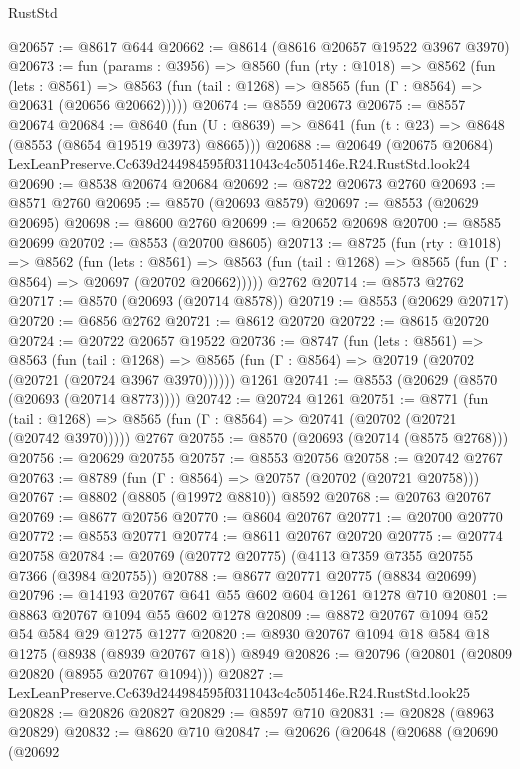 \begin{lexlean}{RustStd}
\begin{coremodule}
@20657 := @8617 @644
@20662 := @8614 (@8616 @20657 @19522 @3967 @3970)
@20673 := fun (params : @3956) =>
  @8560
    (fun (rty : @1018) =>
    @8562
      (fun (lets : @8561) =>
      @8563 (fun (tail : @1268) => @8565 (fun (Γ : @8564) => @20631 (@20656 @20662)))))
@20674 := @8559 @20673
@20675 := @8557 @20674
@20684 := @8640
    (fun (U : @8639) => @8641 (fun (t : @23) => @8648 (@8553 (@8654 @19519 @3973) @8665)))
@20688 := @20649
    (@20675 @20684)
    LexLeanPreserve.Cc639d244984595f0311043c4c505146e.R24.RustStd.look24
@20690 := @8538 @20674 @20684
@20692 := @8722 @20673 @2760
@20693 := @8571 @2760
@20695 := @8570 (@20693 @8579)
@20697 := @8553 (@20629 @20695)
@20698 := @8600 @2760
@20699 := @20652 @20698
@20700 := @8585 @20699
@20702 := @8553 (@20700 @8605)
@20713 := @8725
    (fun (rty : @1018) =>
    @8562
      (fun (lets : @8561) =>
      @8563 (fun (tail : @1268) => @8565 (fun (Γ : @8564) => @20697 (@20702 @20662)))))
    @2762
@20714 := @8573 @2762
@20717 := @8570 (@20693 (@20714 @8578))
@20719 := @8553 (@20629 @20717)
@20720 := @6856 @2762
@20721 := @8612 @20720
@20722 := @8615 @20720
@20724 := @20722 @20657 @19522
@20736 := @8747
    (fun (lets : @8561) =>
    @8563
      (fun (tail : @1268) =>
      @8565 (fun (Γ : @8564) => @20719 (@20702 (@20721 (@20724 @3967 @3970))))))
    @1261
@20741 := @8553 (@20629 (@8570 (@20693 (@20714 @8773))))
@20742 := @20724 @1261
@20751 := @8771
    (fun (tail : @1268) => @8565 (fun (Γ : @8564) => @20741 (@20702 (@20721 (@20742 @3970)))))
    @2767
@20755 := @8570 (@20693 (@20714 (@8575 @2768)))
@20756 := @20629 @20755
@20757 := @8553 @20756
@20758 := @20742 @2767
@20763 := @8789 (fun (Γ : @8564) => @20757 (@20702 (@20721 @20758)))
@20767 := @8802 (@8805 (@19972 @8810)) @8592
@20768 := @20763 @20767
@20769 := @8677 @20756
@20770 := @8604 @20767
@20771 := @20700 @20770
@20772 := @8553 @20771
@20774 := @8611 @20767 @20720
@20775 := @20774 @20758
@20784 := @20769 (@20772 @20775) (@4113 @7359 @7355 @20755 @7366 (@3984 @20755))
@20788 := @8677 @20771 @20775 (@8834 @20699)
@20796 := @14193 @20767 @641 @55 @602 @604 @1261 @1278 @710
@20801 := @8863 @20767 @1094 @55 @602 @1278
@20809 := @8872 @20767 @1094 @52 @54 @584 @29 @1275 @1277
@20820 := @8930 @20767 @1094 @18 @584 @18 @1275 (@8938 (@8939 @20767 @18)) @8949
@20826 := @20796 (@20801 (@20809 @20820 (@8955 @20767 @1094)))
@20827 := LexLeanPreserve.Cc639d244984595f0311043c4c505146e.R24.RustStd.look25
@20828 := @20826 @20827
@20829 := @8597 @710
@20831 := @20828 (@8963 @20829)
@20832 := @8620 @710
@20847 := @20626
    (@20648
      (@20688
        (@20690
          (@20692

\end{coremodule}
\end{lexlean}
